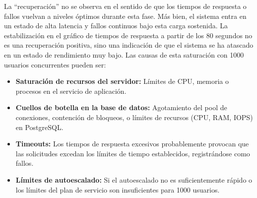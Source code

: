 La ``recuperación'' no se observa en el sentido de que los tiempos de respuesta o fallos vuelvan a niveles óptimos durante esta fase. Más bien, el sistema entra en un estado de alta latencia y fallos continuos bajo esta carga sostenida. La estabilización en el gráfico de tiempos de respuesta a partir de los 80 segundos no es una recuperación positiva, sino una indicación de que el sistema se ha atascado en un estado de rendimiento muy bajo.
\newline
Las causas de esta saturación con 1000 usuarios concurrentes pueden ser:

\begin{itemize}
    \item \textbf{Saturación de recursos del servidor:} Límites de CPU, memoria o procesos en el servicio de aplicación.
    \item \textbf{Cuellos de botella en la base de datos:} Agotamiento del pool de conexiones, contención de bloqueos, o límites de recursos (CPU, RAM, IOPS) en PostgreSQL.
    \item \textbf{Timeouts:} Los tiempos de respuesta excesivos probablemente provocan que las solicitudes excedan los límites de tiempo establecidos, registrándose como fallos.
    \item \textbf{Límites de autoescalado:} Si el autoescalado no es suficientemente rápido o los límites del plan de servicio son insuficientes para 1000 usuarios.
\end{itemize}